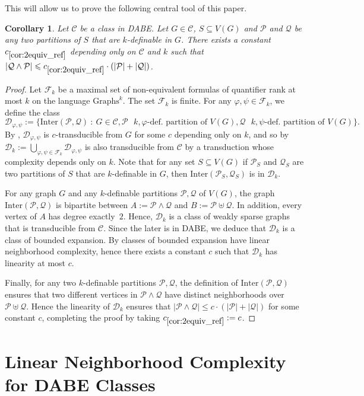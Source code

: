 \documentclass[11pt]{article}
\newtheorem{corollary}[theorem]{Corollary}
\theoremstyle{definition}
\newcommand{\CC}{{\mathscr C}}
\newcommand{\DD}{{\mathscr D}}
\renewcommand{\le}{\leqslant}
\let\phi\varphi
\newcommand{\Pp}{\mathcal{P}}
\newcommand{\Qq}{\mathcal{Q}}
\newcommand{\Graphs}{\mathrm{Graphs}}
\begin{document}
This will allow us to prove the following central tool of this paper.

\begin{corollary}\label{cor:2equiv_ref}
    Let $\CC$ be a class in DABE.
    Let $G \in \CC$, $S \subseteq V(G)$ and $\Pp$ and $\Qq$ be any two partitions of $S$ that are $k$-definable in $G$.
    There exists a constant $c_{\ref{cor:2equiv_ref}}$ depending only on $\CC$ and $k$ such that $|\Qq \wedge \Pp| \le c_{\ref{cor:2equiv_ref}} \cdot (|\Pp| + |\Qq|)$.
\end{corollary}
\begin{proof}
Let $\mathcal F_k$ be a maximal set of non-equivalent formulas of quantifier rank at most $k$ on the language $\Graphs^k$. The set $\mathcal F_k$ is finite.
For any $\phi, \psi \in \mathcal F_k$, we define the class
\[
\DD_{\phi, \psi} := \{\text{Inter}(\Pp,\Qq) ~:~ G \in \CC, \Pp \text{ $k, \phi$-def. partition of } V(G), \Qq \text{ $k, \psi$-def. partition of } V(G)\}.
\]
By , $\DD_{\phi, \psi}$ is $c$-transducible from $G$ for some $c$ depending only on $k$, and so by  $\DD_k := \bigcup_{\phi, \psi \in \mathcal F_k} \DD_{\phi, \psi}$ is also transducible from $\CC$ by a transduction whose complexity depends only on $k$.
Note that for any set $S \subseteq V(G)$ if $\Pp_S$ and $\Qq_S$ are two partitions of $S$ that are $k$-definable in $G$, then $\text{Inter}(\Pp_S, \Qq_S)$ is in $\DD_k$.

For any graph $G$ and any $k$-definable partitions $\Pp, \Qq$ of $V(G)$, the graph $\text{Inter}(\Pp, \Qq)$ is bipartite between $A := \Pp \wedge \Qq$ and $B := \Pp \uplus \Qq$.
In addition, every vertex of $A$ has degree exactly~$2$.
Hence, $\DD_k$ is a class of weakly sparse graphs that is transducible from $\CC$.
Since the later is in DABE, we deduce that $\DD_k$ is a class of bounded expansion.
By  classes of bounded expansion have linear neighborhood complexity, hence there exists a constant $c$ such that $\DD_k$ has linearity at most $c$.

Finally, for any two $k$-definable partitions $\Pp, \Qq$, the definition of $\text{Inter}(\Pp, \Qq)$ ensures that two different vertices in $\Pp \wedge \Qq$ have distinct neighborhoods over $\Pp \uplus \Qq$. Hence the linearity of $\DD_k$ ensures that $|\Pp \wedge \Qq| \le c \cdot (|\Pp| + |\Qq|)$ for some constant $c$, completing the proof by taking $c_{\ref{cor:2equiv_ref}} := c$.
\end{proof}

\section{Linear Neighborhood Complexity for DABE Classes}
\label{sec:nc-dabe}
\end{document}
